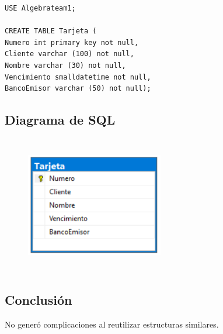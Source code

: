\documentclass[a4paper, 12pt]{article}
\begin{document}
\begin{justify}
\begin{verbatim}
USE Algebrateam1;
    
CREATE TABLE Tarjeta (
Numero int primary key not null,
Cliente varchar (100) not null,
Nombre varchar (30) not null,
Vencimiento smalldatetime not null,
BancoEmisor varchar (50) not null);
\end{verbatim}
        \subsection{Diagrama de SQL}
        \begin{figure}[H]
            \centering
            \includegraphics[width=6cm,height=6cm]{sql_u5t3_1.PNG}
        \end{figure}
        \subsection{Conclusión}
        \justify
        No generó complicaciones al reutilizar estructuras similares.

\end{justify}
\end{document}
